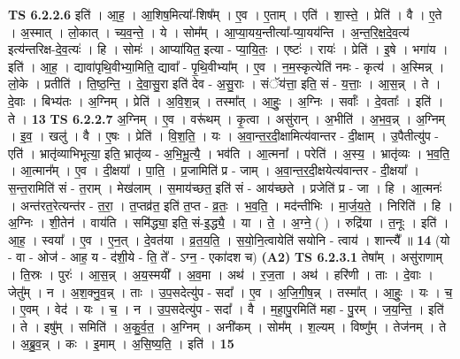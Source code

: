 \documentclass[17pt]{extarticle}
\begin{document}
                                \textbf{ TS 6.2.2.6} \newline
                  इति॑ । आ॒ह॒ । आ॒शिष॒मित्या᳚-शिष᳚म् । ए॒व । ए॒ताम् । एति॑ । शा॒स्ते॒ । प्रेति॑ । वै । ए॒ते । अ॒स्मात् । लो॒कात् । च्य॒व॒न्ते॒ । ये । सोम᳚म् । आ॒प्या॒यय॒न्तीत्या᳚-प्या॒यय॑न्ति । अ॒न्त॒रि॒क्ष॒दे॒व॒त्य॑ इत्य॑न्तरिक्ष-दे॒व॒त्यः॑ । हि । सोमः॑ । आप्या॑यित॒ इत्या - प्या॒यि॒तः॒ । एष्टः॑ । रायः॑ । प्रेति॑ । इ॒षे । भगा॑य । इति॑ । आ॒ह॒ । द्यावा॑पृथि॒वीभ्या॒मिति॒ द्यावा᳚ - पृ॒थि॒वीभ्या᳚म् । ए॒व । न॒म॒स्कृत्येति॑ नमः - कृत्य॑ । अ॒स्मिन्न् । लो॒के । प्रतीति॑ । ति॒ष्ठ॒न्ति॒ । दे॒वा॒सु॒रा इति॑ देव - अ॒सु॒राः । संॅय॑त्ता॒ इति॒ सं - य॒त्ताः॒ । आ॒स॒न्न् । ते । दे॒वाः । बिभ्य॑तः । अ॒ग्निम् । प्रेति॑ । अ॒वि॒श॒न्न् । तस्मा᳚त् । आ॒हुः॒ । अ॒ग्निः । सर्वाः᳚ । दे॒वताः᳚ । इति॑ । ते । \textbf{  13} \newline
                  \newline
                                \textbf{ TS 6.2.2.7} \newline
                  अ॒ग्निम् । ए॒व । वरू॑थम् । कृ॒त्वा । असु॑रान् । अ॒भीति॑ । अ॒भ॒व॒न्न् । अ॒ग्निम् । इ॒व॒ । खलु॑ । वै । ए॒षः । प्रेति॑ । वि॒श॒ति॒ । यः । अ॒वा॒न्त॒र॒दी॒क्षामित्य॑वान्तर - दी॒क्षाम् । उ॒पैतीत्यु॑प - एति॑ । भ्रातृ॑व्याभिभूत्या॒ इति॒ भ्रातृ॑व्य - अ॒भि॒भू॒त्यै॒ । भव॑ति । आ॒त्मना᳚ । परेति॑ । अ॒स्य॒ । भ्रातृ॑व्यः । भ॒व॒ति॒ । आ॒त्मान᳚म् । ए॒व । दी॒क्षया᳚ । पा॒ति॒ । प्र॒जामिति॑ प्र - जाम् । अ॒वा॒न्त॒र॒दी॒क्षयेत्य॑वान्तर - दी॒क्षया᳚ । स॒न्त॒रामिति॑ सं - त॒राम् । मेख॑लाम् । स॒माय॑च्छत॒ इति॑ सं - आय॑च्छते । प्रजेति॑ प्र - जा । हि । आ॒त्मनः॑ । अन्त॑रत॒रेत्यन्त॑र - त॒रा॒ । त॒प्तव्र॑त॒ इति॑ त॒प्त - व्र॒तः॒ । भ॒व॒ति॒ । मद॑न्तीभिः । मा॒र्ज॒य॒ते॒ । निरिति॑ । हि । अ॒ग्निः । शी॒तेन॑ । वाय॑ति । समि॑द्ध्या॒ इति॒ सं-इ॒द्ध्यै॒ । या । ते॒ । अ॒ग्ने॒ ( ) । रुद्रि॑या । त॒नूः । इति॑ । आ॒ह॒ । स्वया᳚ । ए॒व । ए॒न॒त् । दे॒वत॑या । व्र॒त॒य॒ति॒ । स॒यो॒नि॒त्वायेति॑ सयोनि - त्वाय॑ । शान्त्यै᳚ ॥ \textbf{  14 } \newline
                  \newline
                      (यो - वा - ओज॑ - आह॒ य - द॑शी॒ये - ति॒ ते᳚ - ऽग्न॒ - एका॑दश च)  \textbf{(A2)} \newline \newline
                                \textbf{ TS 6.2.3.1} \newline
                  तेषा᳚म् । असु॑राणाम् । ति॒स्रः । पुरः॑ । आ॒स॒न्न् । अ॒य॒स्मयी᳚ । अ॒व॒मा । अथ॑ । र॒ज॒ता । अथ॑ । हरि॑णी । ताः । दे॒वाः । जेतु᳚म् । न । अ॒श॒क्नु॒व॒न्न् । ताः । उ॒प॒सदेत्यु॑प - सदा᳚ । ए॒व । अ॒जि॒गी॒ष॒न्न् । तस्मा᳚त् । आ॒हुः॒ । यः । च॒ । ए॒वम् । वेद॑ । यः । च॒ । न । उ॒प॒सदेत्यु॑प - सदा᳚ । वै । म॒हा॒पु॒रमिति॑ महा - पु॒रम् । ज॒य॒न्ति॒ । इति॑ । ते । इषु᳚म् । समिति॑ । अ॒कु॒र्व॒त॒ । अ॒ग्निम् । अनी॑कम् । सोम᳚म् । श॒ल्यम् । विष्णु᳚म् । तेज॑नम् । ते । अ॒ब्रु॒व॒न्न् । कः । इ॒माम् । अ॒सि॒ष्य॒ति॒ । इति॑ । \textbf{  15} \newline
\end{document}
